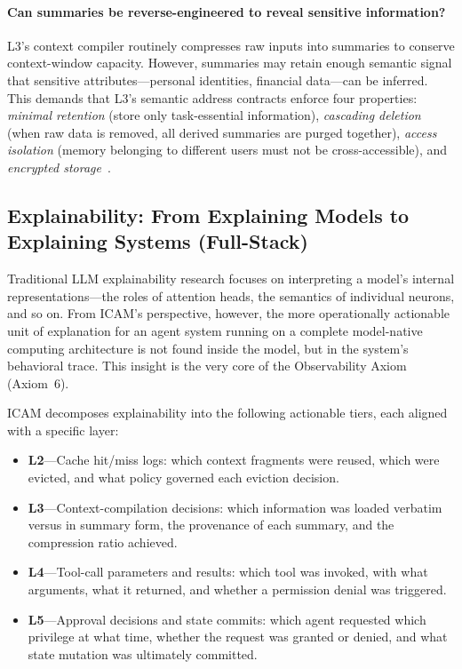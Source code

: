 \documentclass[11pt,a4paper]{article}
\begin{document}
\paragraph{Can summaries be reverse-engineered to reveal sensitive information?}
L3's context compiler routinely compresses raw inputs into summaries to conserve context-window capacity. However, summaries may retain enough semantic signal that sensitive attributes---personal identities, financial data---can be inferred. This demands that L3's semantic address contracts enforce four properties: \emph{minimal retention} (store only task-essential information), \emph{cascading deletion} (when raw data is removed, all derived summaries are purged together), \emph{access isolation} (memory belonging to different users must not be cross-accessible), and \emph{encrypted storage}~\cite{longmemeval2024,navaie2025privacy}.

\subsection{Explainability: From Explaining Models to Explaining Systems (Full-Stack)}
\label{sec:ethics-explainability}

Traditional LLM explainability research focuses on interpreting a model's internal representations---the roles of attention heads, the semantics of individual neurons, and so on. From ICAM's perspective, however, the more operationally actionable unit of explanation for an agent system running on a complete model-native computing architecture is not found inside the model, but in the system's behavioral trace. This insight is the very core of the Observability Axiom (Axiom~6).

ICAM decomposes explainability into the following actionable tiers, each aligned with a specific layer:

\begin{itemize}[nosep]
\item \textbf{L2}---Cache hit/miss logs: which context fragments were reused, which were evicted, and what policy governed each eviction decision.
\item \textbf{L3}---Context-compilation decisions: which information was loaded verbatim versus in summary form, the provenance of each summary, and the compression ratio achieved.
\item \textbf{L4}---Tool-call parameters and results: which tool was invoked, with what arguments, what it returned, and whether a permission denial was triggered.
\item \textbf{L5}---Approval decisions and state commits: which agent requested which privilege at what time, whether the request was granted or denied, and what state mutation was ultimately committed.
\end{itemize}
\end{document}
